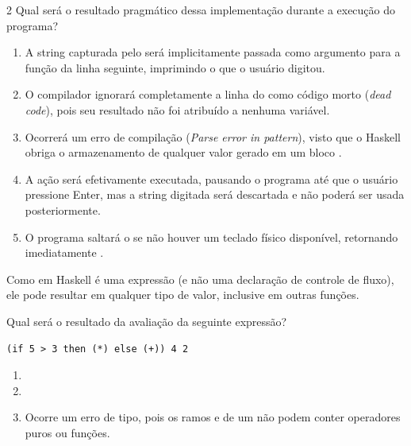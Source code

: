 \documentclass[a4paper,10pt,brazil]{article}
\begin{document}
\begin{multicols}{2}
Qual será o resultado pragmático dessa implementação durante a execução do programa?

\begin{enumerate}
  \item A string capturada pelo  será implicitamente passada como argumento para a função  da linha seguinte, imprimindo o que o usuário digitou.

  \item O compilador ignorará completamente a linha do  como código morto (\emph{dead code}), pois seu resultado não foi atribuído a nenhuma variável.

  \item Ocorrerá um erro de compilação (\emph{Parse error in pattern}), visto que o Haskell obriga o armazenamento de qualquer valor gerado em um bloco .

  \item A ação  será efetivamente executada, pausando o programa até que o usuário pressione Enter, mas a string digitada será descartada e não poderá ser usada posteriormente.

  \item O programa saltará o  se não houver um teclado físico disponível, retornando imediatamente .


\end{enumerate}

Como  em Haskell é uma expressão (e não uma declaração de controle de fluxo), ele pode resultar em qualquer tipo de valor, inclusive em outras funções. 

Qual será o resultado da avaliação da seguinte expressão?
\begin{verbatim}
(if 5 > 3 then (*) else (+)) 4 2
\end{verbatim}

\begin{enumerate}
  \item {}

  \item {}

  \item Ocorre um erro de tipo, pois os ramos  e  de um  não podem conter operadores puros ou funções.


\end{enumerate}
\end{multicols}
\end{document}
